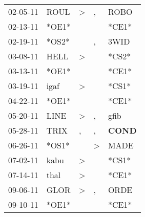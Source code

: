 \begin{supertabular}{p{0.07\textwidth}p{0.06\textwidth}p{0.02\textwidth}p{0.02\textwidth}p{0.06\textwidth}}
          02-05-11\textsuperscript{} &           ROUL\textsuperscript{} &     \textgreater &                , &           ROBO\textsuperscript{} \\
          02-13-11\textsuperscript{} &                            *OE1* &                  &                  &                            *CE1* \\
          02-19-11\textsuperscript{} &                            *OS2* &                  &                , &           3WID\textsuperscript{} \\
          03-08-11\textsuperscript{} &           HELL\textsuperscript{} &     \textgreater &                  &                            *CS2* \\
          03-13-11\textsuperscript{} &                            *OE1* &                  &                  &                            *CE1* \\
          03-19-11\textsuperscript{} &           igaf\textsuperscript{} &     \textgreater &                  &                            *CS1* \\
          04-22-11\textsuperscript{} &                            *OE1* &                  &                  &                            *CE1* \\
          05-20-11\textsuperscript{} &           LINE\textsuperscript{} &     \textgreater &                , &           gfib\textsuperscript{} \\
          05-28-11\textsuperscript{} &           TRIX\textsuperscript{} &                , &                , &  \textbf{COND\textsuperscript{}} \\
          06-26-11\textsuperscript{} &                            *OS1* &                  &     \textgreater &           MADE\textsuperscript{} \\
          07-02-11\textsuperscript{} &           kabu\textsuperscript{} &     \textgreater &                  &                            *CS1* \\
          07-14-11\textsuperscript{} &           thal\textsuperscript{} &     \textgreater &                  &                            *CE1* \\
          09-06-11\textsuperscript{} &           GLOR\textsuperscript{} &     \textgreater &                , &           ORDE\textsuperscript{} \\
          09-10-11\textsuperscript{} &                            *OE1* &                  &                  &                            *CE1* \\

\end{supertabular}
